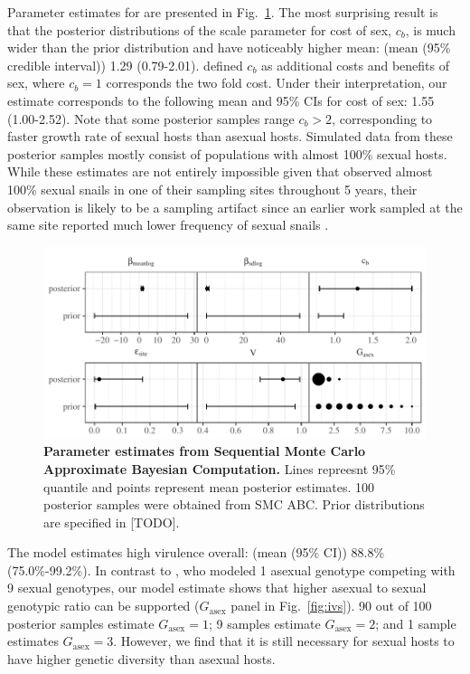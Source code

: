 \documentclass{article}\usepackage[]{graphicx}\usepackage[]{color}
\newcommand{\fref}[1]{Fig.~\ref{fig:#1}}
\begin{document}
Parameter estimates for \cite{vergara2014infection} are presented in \fref{smcparam}.
The most surprising result is that the posterior distributions of the scale parameter for cost of sex, $c_b$, is much wider than the prior distribution and have noticeably higher mean: (mean (95\% credible interval)) 1.29 (0.79-2.01).
\cite{ashby2015diversity} defined $c_b$ as additional costs and benefits of sex, where $c_b=1$ corresponds the two fold cost.
Under their interpretation, our estimate corresponds to the following mean and 95\% CIs for cost of sex: 1.55 (1.00-2.52).
Note that some posterior samples range $c_b > 2$, corresponding to faster growth rate of sexual hosts than asexual hosts.
Simulated data from these posterior samples mostly consist of populations with almost 100\% sexual hosts.
While these estimates are not entirely impossible given that \cite{vergara2014infection} observed almost 100\% sexual snails in one of their sampling sites throughout 5 years, their observation is likely to be a sampling artifact since an earlier work sampled at the same site reported much lower frequency of sexual snails \citep{vergara2013geographic}. %

\begin{figure}[!ht]
\includegraphics[width=\textwidth]{../fig/verg_post.pdf}
\caption{{\bf Parameter estimates from Sequential Monte Carlo Approximate Bayesian Computation.}
Lines repreesnt 95\% quantile and points represent mean posterior estimates. 100 posterior samples were obtained from SMC ABC. Prior distributions are specified in [TODO].
}
\label{fig:smcparam}
\end{figure}

The model estimates high virulence overall: (mean (95\% CI)) 88.8\% (75.0\%-99.2\%).
In contrast to \cite{lively2010epidemiological}, who modeled 1 asexual genotype competing with 9 sexual genotypes, our model estimate shows that higher asexual to sexual genotypic ratio can be supported ($G_{\textrm{asex}}$ panel in \fref{ivs}).
90 out of 100 posterior samples estimate $G_{\textrm{asex}} = 1$; 9 samples estimate $G_{\textrm{asex}} = 2$; and 1 sample estimates $G_{\textrm{asex}} = 3$.
However, we find that it is still necessary for sexual hosts to have higher genetic diversity than asexual hosts.
\end{document}
